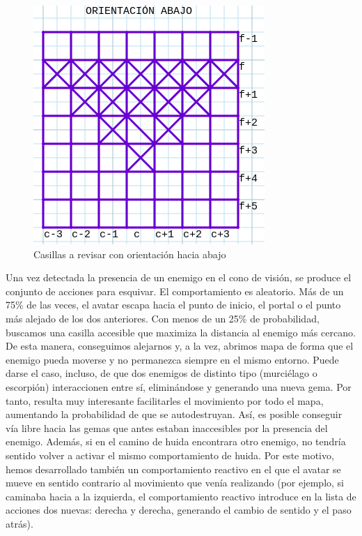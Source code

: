 \begin{figure}[H] %
	\centering
	\includegraphics[scale=0.6]{or-abaj.png}  %
	\caption{Casillas a revisar con orientación hacia abajo} 
	\label{fig:orientación-abaj}
\end{figure}

Una vez detectada la presencia de un enemigo en el cono de visión, se produce el conjunto de acciones para esquivar. El comportamiento es aleatorio. Más de un 75\% de las veces, el avatar escapa hacia el punto de inicio, el portal o el punto más alejado de los dos anteriores. Con menos de un 25\% de probabilidad, buscamos una casilla accesible que maximiza la distancia al enemigo más cercano. De esta manera, conseguimos alejarnos y, a la vez, abrimos mapa de forma que el enemigo pueda moverse y no permanezca siempre en el mismo entorno. Puede darse el caso, incluso, de que dos enemigos de distinto tipo (murciélago o escorpión) interaccionen entre sí, eliminándose y generando una nueva gema. Por tanto, resulta muy interesante facilitarles el movimiento por todo el mapa, aumentando la probabilidad de que se autodestruyan. Así, es posible conseguir vía libre hacia las gemas que antes estaban inaccesibles por la presencia del enemigo. Además, si en el camino de huida encontrara otro enemigo, no tendría sentido volver a activar el mismo comportamiento de huida. Por este motivo, hemos desarrollado también un comportamiento reactivo en el que el avatar se mueve en sentido contrario al movimiento que venía realizando (por ejemplo, si caminaba hacia a la izquierda, el comportamiento reactivo introduce en la lista de acciones dos nuevas: derecha y derecha, generando el cambio de sentido y el paso atrás).


